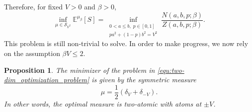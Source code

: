 \documentclass[reqno,11pt]{amsart}
\newcommand{\1}{\mathds{1}}
\theoremstyle{plain}
\newtheorem{proposition}[theorem]{Proposition}
\theoremstyle{definition}
\numberwithin{equation}{section}
\begin{document}
Therefore, for fixed $V>0$ and $\beta>0$,
\begin{equation}
    \label{equ:two-dim_optimization_problem}
    \inf_{\mu\in\mathcal{S}_{V^{2}}}
        \mathbb{E}^{\mu_\beta}[S]
    =
    \inf_{\substack{0<a\le b,\; p\in[0,1]\\
                    pa^{2}+(1-p)b^{2}=V^{2}}}
        \frac{N(a,b,p;\beta)}{Z(a,b,p;\beta)}.
\end{equation}
This problem is still non-trivial to solve. In order to make progress, we now rely on the assumption $\beta V \le 2$.

\begin{proposition}
    \label{prop:minimiser_is_two_point}
    The minimizer of the problem in \eqref{equ:two-dim_optimization_problem} is given by the symmetric measure
    $$\mu = \frac 1 2 (\delta_V + \delta_{-V}).$$
    In other words, the optimal measure is two-atomic with atoms at $\pm V$.
\end{proposition}
\end{document}
